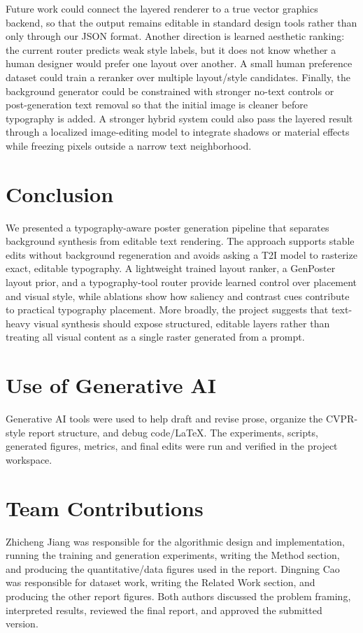 \documentclass[10pt,twocolumn,letterpaper]{article}
\begin{document}
Future work could connect the layered renderer to a true vector graphics backend, so that the output remains editable in standard design tools rather than only through our JSON format. Another direction is learned aesthetic ranking: the current router predicts weak style labels, but it does not know whether a human designer would prefer one layout over another. A small human preference dataset could train a reranker over multiple layout/style candidates. Finally, the background generator could be constrained with stronger no-text controls or post-generation text removal so that the initial image is cleaner before typography is added. A stronger hybrid system could also pass the layered result through a localized image-editing model to integrate shadows or material effects while freezing pixels outside a narrow text neighborhood.

\section{Conclusion}

We presented a typography-aware poster generation pipeline that separates background synthesis from editable text rendering. The approach supports stable edits without background regeneration and avoids asking a T2I model to rasterize exact, editable typography. A lightweight trained layout ranker, a GenPoster layout prior, and a typography-tool router provide learned control over placement and visual style, while ablations show how saliency and contrast cues contribute to practical typography placement. More broadly, the project suggests that text-heavy visual synthesis should expose structured, editable layers rather than treating all visual content as a single raster generated from a prompt.

\section{Use of Generative AI}

Generative AI tools were used to help draft and revise prose, organize the CVPR-style report structure, and debug code/LaTeX. The experiments, scripts, generated figures, metrics, and final edits were run and verified in the project workspace.

\section{Team Contributions}

Zhicheng Jiang was responsible for the algorithmic design and implementation, running the training and generation experiments, writing the Method section, and producing the quantitative/data figures used in the report. Dingning Cao was responsible for dataset work, writing the Related Work section, and producing the other report figures. Both authors discussed the problem framing, interpreted results, reviewed the final report, and approved the submitted version.

{
    \small
    
    
}
\end{document}
